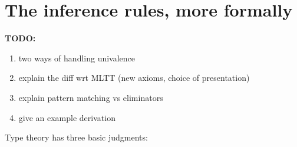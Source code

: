 \egroup

\section{The inference rules, more formally}\label{syntax-more-formally}

\bgroup %

\renewcommand{\G}{\Gamma}
\newcommand{\ctx}{\ensuremath{\mathsf{ctx}}}
\newcommand{\emptyctx}{\cdot}
\newcommand{\wfctx}[1]{\vdash #1\ \ctx}
\newcommand{\oftp}[3]{#1 \vdash #2 : #3}
\newcommand{\jdeqtp}[4]{#1 \vdash #2 \jdeq #3 : #4}
\newcommand{\judg}[2]{#1 \vdash #2}
\newcommand{\tmtp}[2]{#1 \mathord{:} #2}
\newcommand{\form}{\textsc{form}}
\newcommand{\intro}{\textsc{intro}}
\newcommand{\elim}{\textsc{elim}}
\newcommand{\comp}{\textsc{comp}}
\newcommand{\Weak}{\mathsf{Wkg}}
\newcommand{\Vble}{\mathsf{Vble}}
\newcommand{\Exch}{\mathsf{Exch}}
\newcommand{\Subst}{\mathsf{Subst}}

\let\syn\mathsf

\textbf{TODO:} 
\begin{enumerate}
\item two ways of handling univalence
\item explain the diff wrt MLTT (new axioms, choice of presentation)
\item explain pattern matching vs eliminators
\item give an example derivation
\end{enumerate}



Type theory has three basic judgments:

